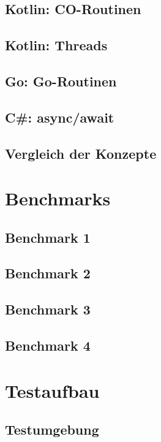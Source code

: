 \documentclass[fontsize=12pt,paper=a4,twoside=semi,parskip=half-,headsepline,headinclude]{scrreprt}
\begin{document}
\section{Kotlin: CO-Routinen}

\section{Kotlin: Threads}

\section{Go: Go-Routinen}

\section{C\#: async/await}

\section{Vergleich der Konzepte}



\chapter{Benchmarks}

\section{Benchmark 1}

\section{Benchmark 2}

\section{Benchmark 3}

\section{Benchmark 4}



\chapter{Testaufbau}

\section{Testumgebung}
\end{document}
